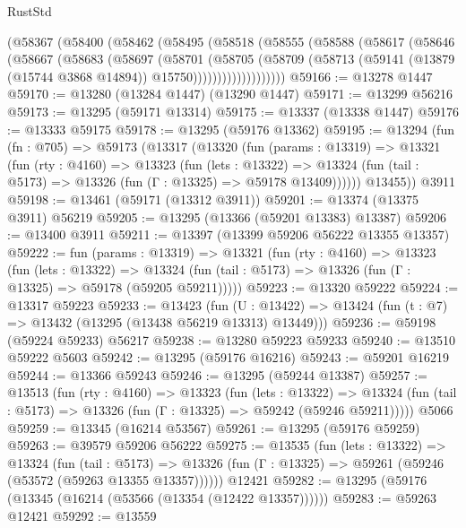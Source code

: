 \begin{lexlean}{RustStd}
\begin{coremodule}
        (@58367
          (@58400
            (@58462
              (@58495
                (@58518
                  (@58555
                    (@58588
                      (@58617
                        (@58646
                          (@58667
                            (@58683
                              (@58697
                                (@58701
                                  (@58705
                                    (@58709
                                      (@58713
                                        (@59141
                                          (@13879 (@15744 @3868 @14894))
                                          @15750)))))))))))))))))))
@59166 := @13278 @1447
@59170 := @13280 (@13284 @1447) (@13290 @1447)
@59171 := @13299 @56216
@59173 := @13295 (@59171 @13314)
@59175 := @13337 (@13338 @1447)
@59176 := @13333 @59175
@59178 := @13295 (@59176 @13362)
@59195 := @13294
    (fun (fn : @705) =>
    @59173
      (@13317
        (@13320
          (fun (params : @13319) =>
          @13321
            (fun (rty : @4160) =>
            @13323
              (fun (lets : @13322) =>
              @13324 (fun (tail : @5173) => @13326 (fun (Γ : @13325) => @59178 @13409))))))
        @13455))
    @3911
@59198 := @13461 (@59171 (@13312 @3911))
@59201 := @13374 (@13375 @3911) @56219
@59205 := @13295 (@13366 (@59201 @13383) @13387)
@59206 := @13400 @3911
@59211 := @13397 (@13399 @59206 @56222 @13355 @13357)
@59222 := fun (params : @13319) =>
  @13321
    (fun (rty : @4160) =>
    @13323
      (fun (lets : @13322) =>
      @13324 (fun (tail : @5173) => @13326 (fun (Γ : @13325) => @59178 (@59205 @59211)))))
@59223 := @13320 @59222
@59224 := @13317 @59223
@59233 := @13423
    (fun (U : @13422) => @13424 (fun (t : @7) => @13432 (@13295 (@13438 @56219 @13313) @13449)))
@59236 := @59198 (@59224 @59233) @56217
@59238 := @13280 @59223 @59233
@59240 := @13510 @59222 @5603
@59242 := @13295 (@59176 @16216)
@59243 := @59201 @16219
@59244 := @13366 @59243
@59246 := @13295 (@59244 @13387)
@59257 := @13513
    (fun (rty : @4160) =>
    @13323
      (fun (lets : @13322) =>
      @13324 (fun (tail : @5173) => @13326 (fun (Γ : @13325) => @59242 (@59246 @59211)))))
    @5066
@59259 := @13345 (@16214 @53567)
@59261 := @13295 (@59176 @59259)
@59263 := @39579 @59206 @56222
@59275 := @13535
    (fun (lets : @13322) =>
    @13324
      (fun (tail : @5173) =>
      @13326 (fun (Γ : @13325) => @59261 (@59246 (@53572 (@59263 @13355 @13357))))))
    @12421
@59282 := @13295 (@59176 (@13345 (@16214 (@53566 (@13354 (@12422 @13357))))))
@59283 := @59263 @12421
@59292 := @13559

\end{coremodule}
\end{lexlean}
